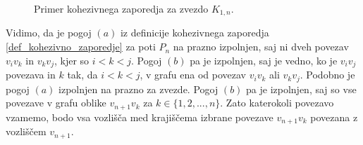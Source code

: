 \documentclass[a4paper, 12pt]{book}
\begin{document}



\begin{figure}[h]
    \begin{center}        
    \end{center}
    \caption{Primer kohezivnega zaporedja za zvezdo $K_{1, n}$.}
    \label{graf_kohezivnega_zaporedja_zvezda}
\end{figure}

Vidimo, da je pogoj $(a)$ iz definicije kohezivnega zaporedja \ref{def_kohezivno_zaporedje} za poti $P_n$ na prazno izpolnjen, saj ni dveh povezav $v_iv_k$ in $v_kv_j$, kjer so $i < k < j$. Pogoj $(b)$ pa je izpolnjen, saj je vedno, ko je $v_iv_j$ povezava in $k$ tak, da $i < k < j$, v grafu ena od povezav $v_iv_k$ ali $v_kv_j$. Podobno je pogoj $(a)$ izpolnjen na prazno za zvezde. Pogoj $(b)$ pa je izpolnjen, saj so vse povezave v grafu oblike $v_{n+1}v_k$ za $k \in \{ 1, 2, ..., n \}$. Zato katerokoli povezavo vzamemo, bodo vsa vozlišča med krajiščema izbrane povezave $v_{n+1}v_k$ povezana z vozliščem $v_{n+1}$.
\end{document}
